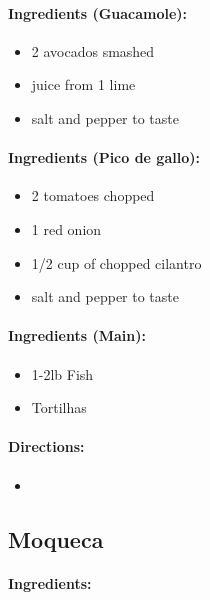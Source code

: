 \documentclass{article}
\begin{document}
\paragraph{Ingredients (Guacamole):}
\begin{itemize}
	\item 2 avocados smashed
	\item juice from 1 lime
	\item salt and pepper to taste
\end{itemize}

\paragraph{Ingredients (Pico de gallo):}
\begin{itemize}
	\item 2 tomatoes chopped
	\item 1 red onion
	\item 1/2 cup of chopped cilantro
	\item salt and pepper to taste
\end{itemize}

\paragraph{Ingredients (Main):}
\begin{itemize}
	\item 1-2lb Fish
	\item Tortilhas
\end{itemize}

\paragraph{Directions:}
\begin{itemize}
	\item
\end{itemize}

\subsection{Moqueca}

\paragraph{Ingredients:}
\end{document}
